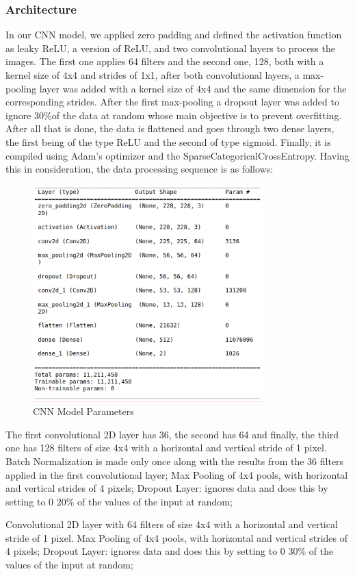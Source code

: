\documentclass[conference]{IEEEtran}
\begin{document}
\subsubsection{Architecture}
In our CNN model, we applied zero padding and defined the activation function as leaky ReLU, a version of ReLU, and two convolutional layers to process the images. The first one applies 64 filters and the second one, 128, both with a kernel size of 4x4 and strides of 1x1, after both convolutional layers, a max-pooling layer was added with a kernel size of 4x4 and the same dimension for the corresponding strides. After the first max-pooling a dropout layer was added to ignore 30\%of the data at random whose main objective is to prevent overfitting. After all that is done, the data is flattened and goes through two dense layers, the first being of the type ReLU and the second of type sigmoid. Finally, it is compiled using Adam's optimizer and the SparseCategoricalCrossEntropy.
Having this in consideration, the data processing sequence is as follows:
\begin{figure}[H]
    \centering
    \includegraphics[width=3.5in]{CNN-Architecture.png}
    \caption{CNN Model Parameters}\label{fig:fig4}
\end{figure}
    The first convolutional 2D layer has 36, the second has 64 and finally, the third one has 128 filters of size 4x4 with a horizontal and vertical stride of 1 pixel. Batch Normalization is made only once along with the results from the 36 filters applied in the first convolutional layer;
  Max Pooling of 4x4 pools, with horizontal and vertical strides of 4 pixels;
  Dropout Layer: ignores data and does this by setting to 0 20\% of the values of the input at random;
  
  Convolutional 2D layer with 64 filters of size 4x4 with a horizontal and vertical stride of 1 pixel.
  Max Pooling of 4x4 pools, with horizontal and vertical strides of 4 pixels;
  Dropout Layer: ignores data and does this by setting to 0 30\% of the values of the input at random;
  
\end{document}
